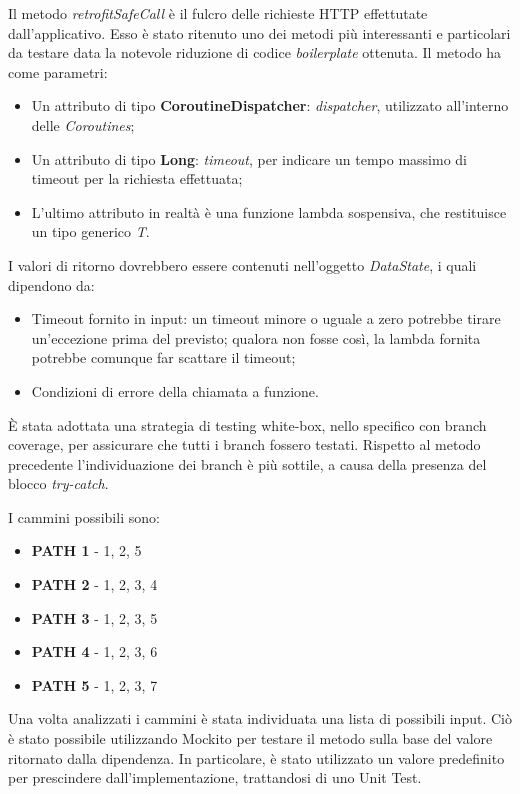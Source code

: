 \documentclass{natourDoc}
\begin{document}
Il metodo \textit{retrofitSafeCall} è il fulcro delle richieste HTTP effettutate dall'applicativo. Esso è stato ritenuto
uno dei metodi più interessanti e particolari da testare data la notevole riduzione di codice \textit{boilerplate} ottenuta.
Il metodo ha come parametri:
\begin{itemize}
	\item Un attributo di tipo \textbf{CoroutineDispatcher}: \textit{dispatcher}, utilizzato all'interno delle \textit{Coroutines};
	\item Un attributo di tipo \textbf{Long}: \textit{timeout}, per indicare un tempo massimo di timeout per la richiesta effettuata;
	\item L'ultimo attributo in realtà è una funzione lambda sospensiva, che restituisce un tipo generico \textit{T}.
\end{itemize}

I valori di ritorno dovrebbero essere contenuti nell'oggetto \textit{DataState}, i quali dipendono da:
\begin{itemize}
	\item Timeout fornito in input: un timeout minore o uguale a zero potrebbe tirare un'eccezione prima del previsto;
																	qualora non fosse così, la lambda fornita potrebbe comunque far scattare il timeout;
	\item Condizioni di errore della chiamata a funzione.
\end{itemize}

È stata adottata una strategia di testing white-box, nello specifico con branch coverage, per assicurare che tutti i branch fossero testati.
Rispetto al metodo precedente l'individuazione dei branch è più sottile, a causa della presenza del blocco \textit{try-catch}.

I cammini possibili sono:
\begin{itemize}
	\item \textbf{PATH 1} - 1, 2, 5
	\item \textbf{PATH 2} - 1, 2, 3, 4
	\item \textbf{PATH 3} - 1, 2, 3, 5
	\item \textbf{PATH 4} - 1, 2, 3, 6
	\item \textbf{PATH 5} - 1, 2, 3, 7
\end{itemize}

Una volta analizzati i cammini è stata individuata una lista di possibili input. 
Ciò è stato possibile utilizzando Mockito per testare il metodo sulla base del valore ritornato dalla dipendenza. In particolare, è stato utilizzato un valore predefinito per prescindere dall'implementazione, trattandosi di uno Unit Test.
\end{document}
